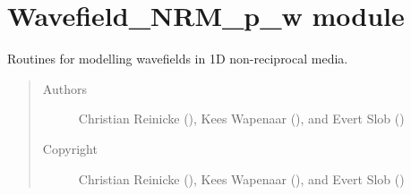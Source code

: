 \documentclass[letterpaper,10pt,english]{sphinxmanual}
\begin{document}
\begin{fulllineitems}
\begin{fulllineitems}
%
\begin{sphinxVerbatim}[commandchars=\\\{\}]
\PYG{p}{[}\PYG{p}{]}
\end{sphinxVerbatim}

\end{fulllineitems}


\end{fulllineitems}



\section{Wavefield\_NRM\_p\_w module}
\label{\detokenize{Wavefield_NRM_p_w::doc}}\label{\detokenize{Wavefield_NRM_p_w:module-Wavefield_NRM_p_w}}\label{\detokenize{Wavefield_NRM_p_w:wavefield-nrm-p-w-module}}
Routines for modelling wavefields in 1D non-reciprocal media.

\label{\detokenize{Wavefield_NRM_p_w:module-Wavefield_NRM_p_w}}\begin{quote}\begin{description}
\item[{Authors}] \leavevmode
Christian Reinicke (), Kees Wapenaar (), and Evert Slob ()

\item[{Copyright}] \leavevmode
Christian Reinicke (), Kees Wapenaar (), and Evert Slob ()

\end{description}\end{quote}
\end{document}
